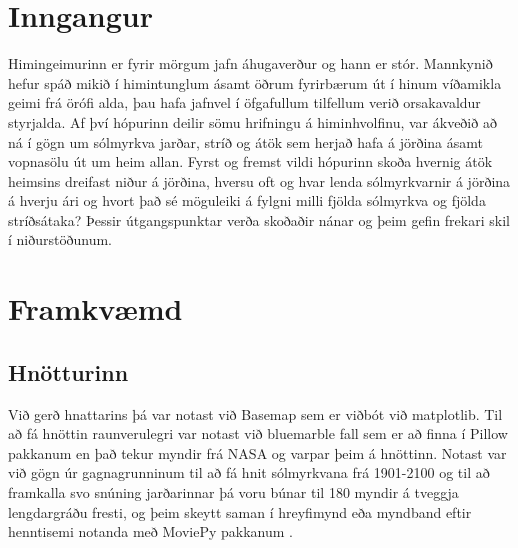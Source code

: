 \documentclass[12pt, git, final]{rureport}
\begin{document}
\maketitle  %


%
\section{Inngangur} %
Himingeimurinn er fyrir mörgum jafn áhugaverður og hann er stór. Mannkynið hefur spáð mikið í himintunglum ásamt öðrum fyrirbærum út í hinum víðamikla geimi frá örófi alda, þau hafa jafnvel í öfgafullum tilfellum verið orsakavaldur styrjalda. Af því hópurinn deilir sömu hrifningu á himinhvolfinu, var ákveðið að ná í gögn um sólmyrkva jarðar, stríð og átök sem herjað hafa á jörðina ásamt vopnasölu út um heim allan. Fyrst og fremst vildi hópurinn skoða hvernig átök heimsins dreifast niður á jörðina, hversu oft og hvar lenda sólmyrkvarnir á jörðina á hverju ári og hvort það sé möguleiki á fylgni milli fjölda sólmyrkva og fjölda stríðsátaka? Þessir útgangspunktar verða skoðaðir nánar og þeim gefin frekari skil í niðurstöðunum.  
\section{Framkvæmd}
\subsection{Hnötturinn}
Við gerð hnattarins þá var notast við Basemap sem er viðbót við matplotlib. Til að fá hnöttin raunverulegri var notast við bluemarble fall sem er að finna í Pillow \cite{pillow} pakkanum en það tekur myndir frá NASA \cite{bluemarble} og varpar þeim á hnöttinn. Notast var við gögn úr gagnagrunninum til að fá hnit sólmyrkvana frá 1901-2100 og til að framkalla svo snúning jarðarinnar þá voru búnar til 180 myndir á tveggja lengdargráðu fresti, og þeim skeytt saman í hreyfimynd eða myndband eftir henntisemi notanda með MoviePy pakkanum \cite{moviepy}.
 
\end{document}
